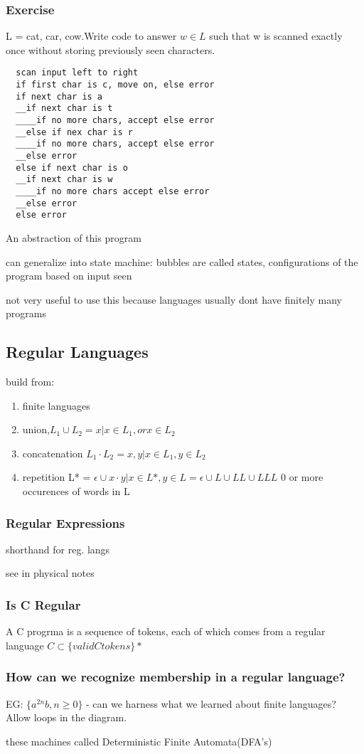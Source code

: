 \documentclass[11pt]{amsart}
\begin{document}
\subsubsection{Exercise}
\par L = {cat, car, cow}.Write code to answer $w\in L$ such that w is scanned
exactly once without storing previously seen characters.
\begin{verbatim}
  scan input left to right
  if first char is c, move on, else error
  if next char is a
  __if next char is t
  ____if no more chars, accept else error
  __else if nex char is r
  ____if no more chars, accept else error
  __else error
  else if next char is o
  __if next char is w
  ____if no more chars accept else error
  __else error
  else error
  \end{verbatim}
  \par An abstraction of this program
  \par can generalize into state machine: bubbles are called states,
  configurations of the program based on input seen
  \par not very useful to use this because languages usually dont have finitely
  many programs
  \subsection{Regular Languages}
  \par build from:
  \begin{enumerate}
    \item finite languages
    \item union,$L_1 \cup L_2 = {x|x\in L_1, or  x\in L_2} $
    \item concatenation $L_1 \cdot L_2 = {x,y|x\in L_1, y\in L_2}$
    \item repetition L* = ${\epsilon}\cup {x \cdot y | x\in L*, y\in L }
      = {\epsilon}\cup L \cup LL \cup LLL$ 0 or more occurences of words in L
  \end{enumerate}
  \subsubsection{Regular Expressions}
  \par shorthand for reg. langs
  \par see in physical notes
  \subsubsection{Is C Regular}
  \par A C progrma is a sequence of tokens, each of which comes from a regular
  language $C\subset\{valid C tokens\}*$
  \subsubsection{How can we recognize membership in a regular language?}
  \par EG: $\{a^{2n}b, n\ge 0\} $ - can we harness what we learned about finite
  languages? Allow loops in the diagram.
  \par these machines called Deterministic Finite Automata(DFA's)
\end{document}
